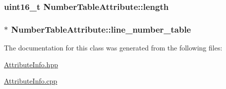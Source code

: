 \subsubsection[{\texorpdfstring{length}{length}}]{\setlength{\rightskip}{0pt plus 5cm}uint16\+\_\+t Number\+Table\+Attribute\+::length}\hypertarget{class_number_table_attribute_a5870a64b7a84529045ab1a659811f859}{}\label{class_number_table_attribute_a5870a64b7a84529045ab1a659811f859}
\subsubsection[{\texorpdfstring{line\+\_\+number\+\_\+table}{line_number_table}}]{$\ast$ Number\+Table\+Attribute\+::line\+\_\+number\+\_\+table}\hypertarget{class_number_table_attribute_ab5e3c231f1507f7be6158422eb71aeeb}{}\label{class_number_table_attribute_ab5e3c231f1507f7be6158422eb71aeeb}


The documentation for this class was generated from the following files\+:\begin{DoxyCompactItemize}
\item 
\hyperlink{_attribute_info_8hpp}{Attribute\+Info.\+hpp}\item 
\hyperlink{_attribute_info_8cpp}{Attribute\+Info.\+cpp}\end{DoxyCompactItemize}
